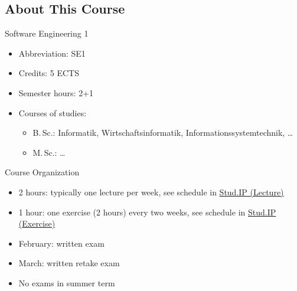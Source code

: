 \newcommand{\StudIPLectureLink}{https://studip.tu-braunschweig.de/dispatch.php/course/details?sem_id=8fa526030e67f6d8e691f934c2e256cd&again=yes}
\newcommand{\StudIPExerciseLink}{https://studip.tu-braunschweig.de/dispatch.php/course/details?sem_id=4b34a635107cde7ef107e91137838beb&again=yes}
\newcommand{\StudIPLecture}{\href{\StudIPLectureLink}{Stud.IP (Lecture)}}
\newcommand{\StudIPExercise}{\href{\StudIPExerciseLink}{Stud.IP (Exercise)}}

\subsection{About This Course} 
\begin{frame}{\insertsubsection}
	\begin{fancycolumns}
		\begin{definition}{Software Engineering 1}
			\begin{itemize}
				\item Abbreviation: SE1
				\item Credits: 5 ECTS %
				\item Semester hours: 2+1
				\item Courses of studies:
				\begin{itemize}
					\item B.\,Sc.: Informatik, Wirtschaftsinformatik, Informationssystemtechnik, \ldots
					\item M.\,Sc.: \ldots
				\end{itemize}
			\end{itemize}
		\end{definition}
		\nextcolumn
		\begin{definition}{Course Organization}
			\begin{itemize}
				\item 2 hours: typically one lecture per week, see schedule in \StudIPLecture
				\item 1 hour: one exercise (2 hours) every two weeks, see schedule in \StudIPExercise
				\item February: written exam
				\item March: written retake exam
				\item No exams in summer term
			\end{itemize}
		\end{definition}
	\end{fancycolumns}
\end{frame}

